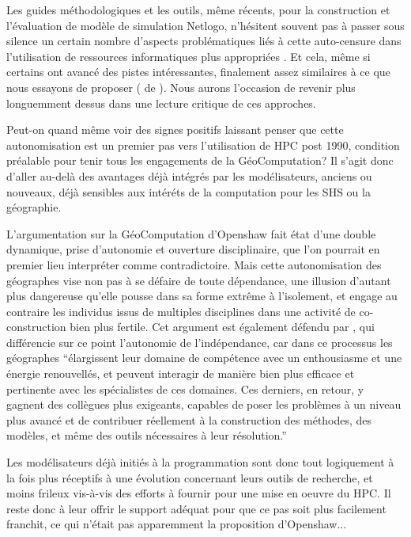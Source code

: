 Les guides méthodologiques et les outils, même récents, pour la construction et l'évaluation de modèle de simulation Netlogo, n'hésitent souvent pas à passer sous silence un certain nombre d'aspects problématiques liés à cette auto-censure dans l'utilisation de ressources informatiques plus appropriées \autocites{Gilbert2008, Grimm2011a}. Et cela, même si certains ont avancé des pistes intéressantes, finalement assez similaires à ce que nous essayons de proposer (\textcite{Behavior Search} de \textcite{Stonedahl2011a}). Nous aurons l'occasion de revenir plus longuemment dessus dans une lecture critique de ces approches.

Peut-on quand même voir des signes positifs laissant penser que cette autonomisation est un premier pas vers l'utilisation de HPC post 1990, condition préalable pour tenir tous les engagements de la GéoComputation? Il s'agit donc d'aller au-delà des avantages déjà intégrés par les modélisateurs, anciens ou nouveaux, déjà sensibles aux intéréts de la computation pour les SHS ou la géographie.

L’argumentation sur la GéoComputation d’Openshaw fait état d’une double dynamique, prise d'autonomie et ouverture disciplinaire, que l’on pourrait en premier lieu interpréter comme contradictoire. Mais cette autonomisation des géographes vise non pas à se défaire de toute dépendance, une illusion d’autant plus dangereuse qu’elle pousse dans sa forme extrême à l’isolement, et engage au contraire les individus issus de multiples disciplines dans une activité de co-construction bien plus fertile. Cet argument est également défendu par \autocite[64]{Banos2013}, qui différencie sur ce point l’autonomie de l’indépendance, car dans ce processus les géographes \enquote{élargissent leur domaine de compétence avec un enthousiasme et une énergie renouvellés, et peuvent interagir de manière bien plus efficace et pertinente avec les spécialistes de ces domaines. Ces derniers, en retour, y gagnent des collègues plus exigeants, capables de poser les problèmes à un niveau plus avancé et de contribuer réellement à la construction des méthodes, des modèles, et même des outils nécessaires à leur résolution.}

Les modélisateurs déjà initiés à la programmation sont donc tout logiquement à la fois plus réceptifs à une évolution concernant leurs outils de recherche, et moins frileux vis-à-vis des efforts à fournir pour une mise en oeuvre du HPC. Il reste donc à leur offrir le support adéquat pour que ce pas soit plus facilement franchit, ce qui n'était pas apparemment la proposition d'Openshaw...

